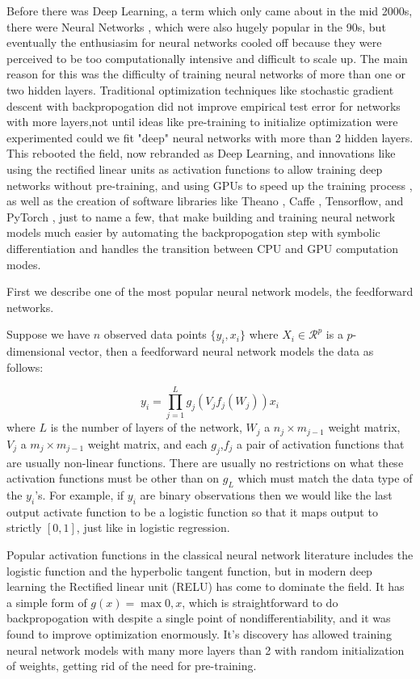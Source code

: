 \documentclass[]{report}
\begin{document}
Before there was Deep Learning, a term which only came about in the mid 2000s, there were Neural Networks \cite{bishop1995neural,ripley2007pattern}, which were also hugely popular in the 90s, but eventually the enthusiasim for neural networks cooled off because they were perceived to be too computationally intensive and difficult to scale up. The main reason for this was the difficulty of training neural networks of more than one or two hidden layers. Traditional optimization techniques like stochastic gradient descent with backpropogation did not improve empirical test error for networks with more layers,not until ideas like pre-training to initialize optimization were experimented could we fit "deep" neural networks with more than 2 hidden layers. This rebooted the field, now rebranded as Deep Learning, and innovations like using the rectified linear units as activation functions \cite{nair2010rectified} to allow training deep networks without pre-training, and using GPUs to speed up the training process \cite{krizhevsky2012imagenet}, as well as the creation of software libraries like Theano \cite{bergstra2010theano}, Caffe \cite{jia2014caffe}, Tensorflow\cite{tensorflow2015-whitepaper}, and PyTorch \cite{paszke2017automatic}, just to name a few, that make building and training neural network models much easier by automating the backpropogation step with symbolic differentiation \cite{bahrampour2015comparative} and handles the transition between CPU and GPU computation modes. 

First we describe one of the most popular neural network models, the feedforward networks.

Suppose we have $n$ observed data points $\{y_i,x_i\}$ where $X_i \in
\mathcal{R}^p$ is a $p$-dimensional vector, then a feedforward neural network models the
data as follows:

\[y_i = \prod_{j=1}^Lg_j(V_jf_j(W_j))x_i \]
where $L$ is the number of layers of the network, $W_j$ a $n_j \times m_{j-1}$
weight matrix, $V_j$ a $m_j \times m_{j-1}$ weight matrix, and each $g_j$,$f_j$
a pair of activation functions that are usually non-linear functions. There are
usually no restrictions on what these activation functions must be other than on
$g_L$ which must match the data type of the $y_i$'s. For example, if $y_i$ are
binary observations then we would like the last output activate function to be a
logistic function so that it maps output to strictly $[0,1]$, just like in
logistic regression.

Popular activation functions in the classical neural network literature includes
the logistic function and the hyperbolic tangent function, but in modern deep
learning the Rectified linear unit (RELU) has come to dominate the field. It has
a simple form of $g(x)=\max{0,x}$, which is straightforward to do
backpropogation with despite a single point of nondifferentiability, and it was
found to improve optimization enormously. It's discovery has allowed training
neural network models with many more layers than 2 with random initialization of
weights, getting rid of the need for pre-training. 
\end{document}
